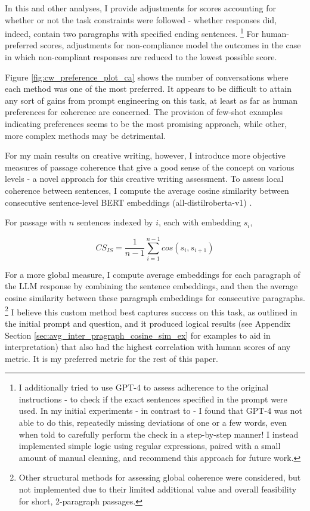 \documentclass[11pt]{article}
\begin{document}
In this and other analyses, I provide adjustments for scores accounting for whether or not the task constraints were followed - whether responses did, indeed, contain two paragraphs with specified ending sentences. \footnote{I additionally tried to use GPT-4 to assess adherence to the original instructions - to check if the exact sentences specified in the prompt were used. In my initial experiments - in contrast to \citealp{yao_tree_2023} - I found that GPT-4 was not able to do this, repeatedly missing deviations of one or a few words, even when told to carefully perform the check in a step-by-step manner! I instead implemented simple logic using regular expressions, paired with a small amount of manual cleaning, and recommend this approach for future work.} For human-preferred scores, adjustments for non-compliance model the outcomes in the case in which non-compliant responses are reduced to the lowest possible score.

Figure \ref{fig:cw_preference_plot_ca} shows the number of conversations where each method was one of the most preferred. It appears to be difficult to attain any sort of gains from prompt engineering on this task, at least as far as human preferences for coherence are concerned. The provision of few-shot examples indicating preferences seems to be the most promising approach, while other, more complex methods may be detrimental.

For my main results on creative writing, however, I introduce more objective measures of passage coherence that give a good sense of the concept on various levels - a novel approach for this creative writing assessment. To assess local coherence between sentences, I compute the average cosine similarity between consecutive sentence-level BERT embeddings (all-distilroberta-v1) \cite{landauer_introduction_1998, noauthor_sentence-transformersall-distilroberta-v1_nodate}. 

For passage with $n$ sentences indexed by $i$, each with embedding $s_{i}$, 

$$CS_{IS}=\frac{1}{n-1}\sum_{i=1}^{n-1}cos(s_{i},s_{i+1})$$

For a more global measure, I compute average embeddings for each paragraph of the LLM response by combining the sentence embeddings, and then the average cosine similarity between these paragraph embeddings for consecutive paragraphs. \footnote{Other structural methods for assessing global coherence were considered, but not implemented due to their limited additional value and overall feasibility for short, 2-paragraph passages.} I believe this custom method best captures success on this task, as outlined in the initial prompt and question, and it produced logical results (see Appendix Section \ref{sec:avg_inter_pragraph_cosine_sim_ex} for examples to aid in interpretation) that also had the highest correlation with human scores of any metric. It is my preferred metric for the rest of this paper. 
\end{document}
